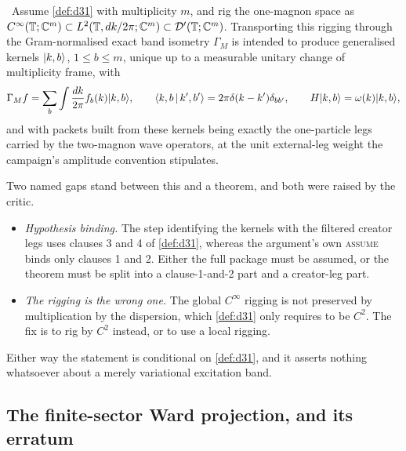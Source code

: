 \begin{theorem}
\label{thm:d31-kernel}
\statusSketch\ Assume \cref{def:d31} with multiplicity $m$, and rig the
one-magnon space as
$C^\infty(\mathbb{T};\mathbb{C}^m)\subset L^2(\mathbb{T},dk/2\pi;\mathbb{C}^m)\subset\mathcal{D}'(\mathbb{T};\mathbb{C}^m)$.
Transporting this rigging through the Gram-normalised exact band isometry
$\Gamma_M$ is intended to produce generalised kernels $|k,b\rangle$,
$1\le b\le m$, unique up to a measurable unitary change of multiplicity frame,
with
\begin{equation}
  \Gamma_Mf=\sum_b\int\frac{dk}{2\pi}f_b(k)|k,b\rangle,
  \qquad
  \langle k,b\,|\,k',b'\rangle=2\pi\delta(k-k')\delta_{bb'},
  \qquad
  H|k,b\rangle=\omega(k)|k,b\rangle,
\end{equation}
and with packets built from these kernels being exactly the one-particle legs
carried by the two-magnon wave operators, at the unit external-leg weight the
campaign's amplitude convention stipulates.
\end{theorem}
\begin{scope}
Two named gaps stand between this and a theorem, and both were raised by the
critic.
\begin{itemize}
\item \emph{Hypothesis binding.} The step identifying the kernels with the
  filtered creator legs uses clauses 3 and 4 of \cref{def:d31}, whereas the
  argument's own \textsc{assume} binds only clauses 1 and 2. Either the full
  package must be assumed, or the theorem must be split into a
  clause-1-and-2 part and a creator-leg part.
\item \emph{The rigging is the wrong one.} The global $C^\infty$ rigging is
  not preserved by multiplication by the dispersion, which \cref{def:d31} only
  requires to be $C^2$. The fix is to rig by $C^2$ instead, or to use a local
  rigging.
\end{itemize}
Either way the statement is conditional on \cref{def:d31}, and it asserts
nothing whatsoever about a merely variational excitation band.
\end{scope}

\subsection{The finite-sector Ward projection, and its erratum}


